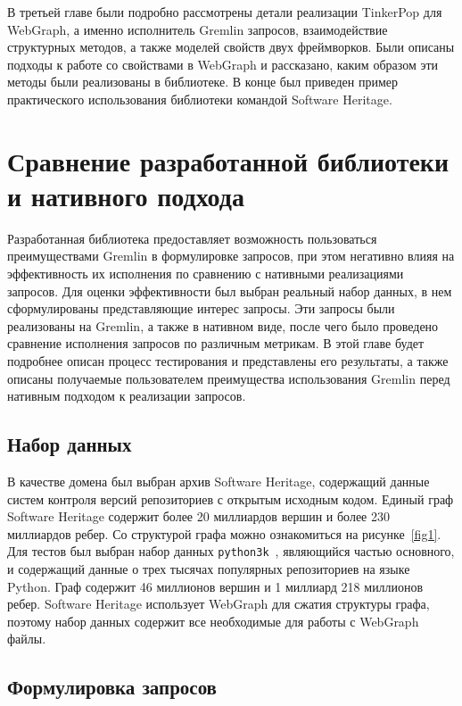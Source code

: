 \documentclass[times,specification,annotation]{itmo-student-thesis}
\begin{document}
\chapterconclusion

В третьей главе были подробно рассмотрены детали реализации TinkerPop для WebGraph, а именно исполнитель Gremlin запросов, взаимодействие структурных методов, а также моделей свойств двух фреймворков. Были описаны подходы к работе со свойствами в WebGraph и рассказано, каким образом эти методы были реализованы в библиотеке. В конце был приведен пример практического использования библиотеки командой Software Heritage.

\chapter{Сравнение разработанной библиотеки и нативного подхода}

Разработанная библиотека предоставляет возможность пользоваться преимуществами Gremlin в формулировке запросов, при этом негативно влияя на эффективность их исполнения по сравнению с нативными реализациями запросов. Для оценки эффективности был выбран реальный набор данных, в нем сформулированы представляющие интерес запросы. Эти запросы были реализованы на Gremlin, а также в нативном виде, после чего было проведено сравнение исполнения запросов по различным метрикам. В этой главе будет подробнее описан процесс тестирования и представлены его результаты, а также описаны получаемые пользователем преимущества использования Gremlin перед нативным подходом к реализации запросов.

\section{Набор данных}

В качестве домена был выбран архив Software Heritage, содержащий данные систем контроля версий репозиториев с открытым исходным кодом. Единый граф Software Heritage содержит более 20 миллиардов вершин и более 230 миллиардов ребер. Со структурой графа можно ознакомиться на рисунке~\ref{fig1}. Для тестов был выбран набор данных \texttt{python3k}~\cite{swh-dataset}, являющийся частью основного, и содержащий данные о трех тысячах популярных репозиториев на языке Python. Граф содержит 46 миллионов вершин и 1 миллиард 218 миллионов ребер. Software Heritage использует WebGraph для сжатия структуры графа, поэтому набор данных содержит все необходимые для работы с WebGraph файлы.

\section{Формулировка запросов}
\end{document}

